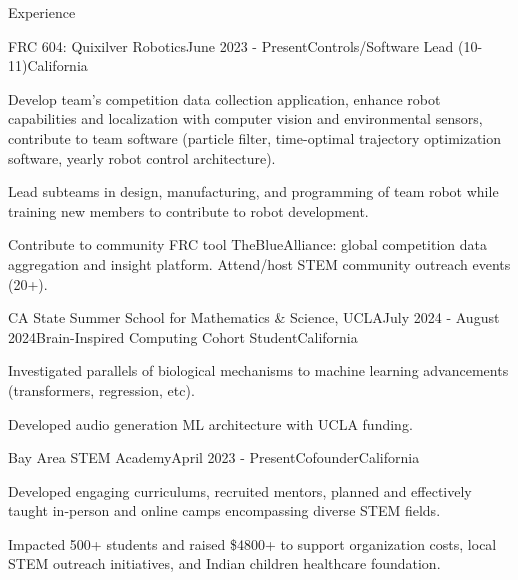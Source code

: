 \documentclass[
  11pt, %
]{public/resume/resume} %
\begin{document}
\sloppy


\begin{rSection}{Experience}


  \begin{rSubsection}{FRC 604: Quixilver Robotics}{June 2023 - Present}{Controls/Software Lead (10-11)}{California}
    
    \item Develop team's competition data collection application, enhance robot capabilities and localization with computer vision and environmental sensors, contribute to team software (particle filter, time-optimal trajectory optimization software, yearly robot control architecture).
    
    \item Lead subteams in design, manufacturing, and programming of team robot while training new members to contribute to robot development.
    
    \item Contribute to community FRC tool TheBlueAlliance: global competition data aggregation and insight platform. Attend/host STEM community outreach events (20+).
    
  \end{rSubsection}
        
  \begin{rSubsection}{CA State Summer School for Mathematics \& Science, UCLA}{July 2024 - August 2024}{Brain-Inspired Computing Cohort Student}{California}
    
    \item Investigated parallels of biological mechanisms to machine learning advancements (transformers, regression, etc).
    
    \item Developed audio generation ML architecture with UCLA funding.
    
  \end{rSubsection}
        
  \begin{rSubsection}{Bay Area STEM Academy}{April 2023 - Present}{Cofounder}{California}
    
    \item Developed engaging curriculums, recruited mentors, planned and effectively taught in-person and online camps encompassing diverse STEM fields.
    
    \item Impacted 500+ students and raised \$4800+ to support organization costs, local STEM outreach initiatives, and Indian children healthcare foundation.
    
  \end{rSubsection}
        
	
\end{rSection}
\end{document}
